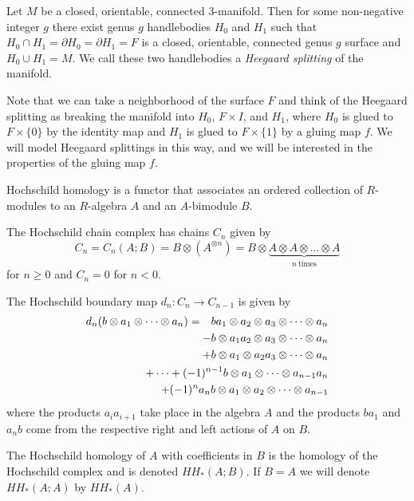 \documentclass{slides}
\newcommand{\ot}{\otimes}
\theoremstyle{definition}
\begin{document}
\begin{slide}
Let $M$ be a closed, orientable, connected 3-manifold.
Then for some non-negative integer $g$ there exist
genus $g$ handlebodies $H_0$ and $H_1$ such that
$H_0 \cap H_1 = \partial H_0 = \partial H_1 = F$
is a closed, orientable, connected genus $g$ surface
and $H_0 \cup H_1 = M$.
We call these two handlebodies a
\textit{Heegaard splitting} of the manifold.

Note that we can take a neighborhood
of the surface $F$ and think of the Heegaard splitting as breaking
the manifold into $H_0$, $F \times I$, and $H_1$, where $H_0$ is
glued to $F \times \{0\}$ by the identity map
and $H_1$ is glued to $F \times \{1\}$ by a gluing map $f$.
We will model Heegaard splittings in this way, and we will be
interested in the properties of the gluing map $f$.
\end{slide}

\begin{slide}
Hochschild homology is a functor that associates an ordered
collection of $R$-modules to an $R$-algebra $A$ and an
$A$-bimodule $B$.

The Hochschild chain complex has chains
$C_n$ given by
\[
C_n = C_n(A; B) = B \ot (A^{\ot n}) = B \ot 
\underbrace{A \ot A \ot \dots \ot A}_{n~\mathrm{times}}
\]
for $n \geq 0$ and
$C_n = 0$ for $n < 0$.
\end{slide}

\begin{slide}
The Hochschild boundary map $d_n : C_n \to C_{n-1}$ is given by
\begin{eqnarray}
d_n ( b \ot a_1 \ot \dots \ot a_n )
& = & b a_1 \ot a_2 \ot a_3 \ot \dots \ot a_n \nonumber \\
& & \hspace{-4cm} - b \ot a_1 a_2 \ot a_3 \ot \dots \ot a_n \nonumber \\
& & \hspace{-4cm} + b \ot a_1 \ot a_2 a_3 \ot \dots \ot a_n \nonumber \\
& & \hspace{-4cm} + \dots + (-1)^{n-1} b \ot a_1 \ot \dots \ot a_{n-1} a_n \nonumber \\
& & \hspace{-4cm} + (-1)^{n} a_n b \ot a_1 \ot a_2 \ot \dots \ot a_{n-1} \nonumber
\end{eqnarray}
where the products $a_i a_{i+1}$ take place in the algebra $A$
and the products $b a_1$ and $a_n b$ come from the respective
right and left actions of $A$ on $B$.

The Hochschild homology of $A$ with coefficients in $B$ is the homology
of the Hochschild complex and is denoted $HH_{*}(A; B)$.
If $B = A$ we will denote $HH_{*}(A; A)$ by $HH_{*}(A)$.
\end{slide}
\end{document}
